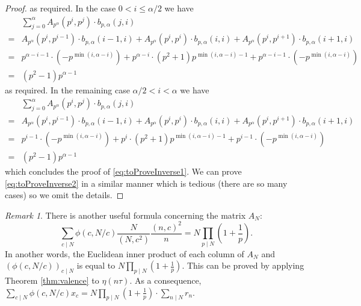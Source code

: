 \documentclass[12pt]{amsart}
\numberwithin{equation}{section}
\theoremstyle{plain}
\theoremstyle{definition}
\theoremstyle{remark}
\newtheorem{rema}[thm]{Remark}
\begin{document}
\begin{proof}
as required. In the case $0<i \leq \alpha/2$ we have
\begin{align*}
&\sum_{j=0}^{\alpha}A_{p^\alpha}(p^i,p^j)\cdot b_{p,\alpha}(j,i)\\
=&A_{p^\alpha}(p^i,p^{i-1})\cdot b_{p,\alpha}(i-1,i)+A_{p^\alpha}(p^i,p^{i})\cdot b_{p,\alpha}(i,i)+A_{p^\alpha}(p^i,p^{i+1})\cdot b_{p,\alpha}(i+1,i)\\
=&p^{\alpha-i-1}\cdot(-p^{\min(i,\alpha-i)}) + p^{\alpha-i}\cdot (p^2+1)p^{\min(i,\alpha-i)-1}+p^{\alpha-i-1}\cdot(-p^{\min(i,\alpha-i)})\\
=&(p^2-1)p^{\alpha-1}
\end{align*}
as required. In the remaining case $\alpha/2<i<\alpha$ we have
\begin{align*}
&\sum_{j=0}^{\alpha}A_{p^\alpha}(p^i,p^j)\cdot b_{p,\alpha}(j,i)\\
=&A_{p^\alpha}(p^i,p^{i-1})\cdot b_{p,\alpha}(i-1,i)+A_{p^\alpha}(p^i,p^{i})\cdot b_{p,\alpha}(i,i)+A_{p^\alpha}(p^i,p^{i+1})\cdot b_{p,\alpha}(i+1,i)\\
=&p^{i-1}\cdot(-p^{\min(i,\alpha-i)}) + p^{i}\cdot (p^2+1)p^{\min(i,\alpha-i)-1}+p^{i-1}\cdot(-p^{\min(i,\alpha-i)})\\
=&(p^2-1)p^{\alpha-1}
\end{align*}
which concludes the proof of \eqref{eq:toProveInverse1}. We can prove \eqref{eq:toProveInverse2} in a similar manner which is tedious (there are so many cases) so we omit the details.
\end{proof}
\begin{rema}
\label{rema:ANcolumn}
There is another useful formula concerning the matrix $A_N$:
\begin{equation*}
\sum_{c\mid N}\phi(c,N/c)\frac{N}{(N,c^2)}\frac{(n,c)^2}{n}=N\prod_{p \mid N}\left(1+\frac{1}{p}\right).
\end{equation*}
In another words, the Euclidean inner product of each column of $A_N$ and $(\phi(c,N/c))_{c\mid N}$ is equal to $N\prod_{p \mid N}\left(1+\frac{1}{p}\right)$. This can be proved by applying Theorem \ref{thm:valence} to $\eta(n\tau)$. As a consequence, $\sum_{c\mid N}\phi(c,N/c)x_c=N\prod_{p \mid N}\left(1+\frac{1}{p}\right)\cdot\sum_{n\mid N}r_n$.
\end{rema}
\end{document}
